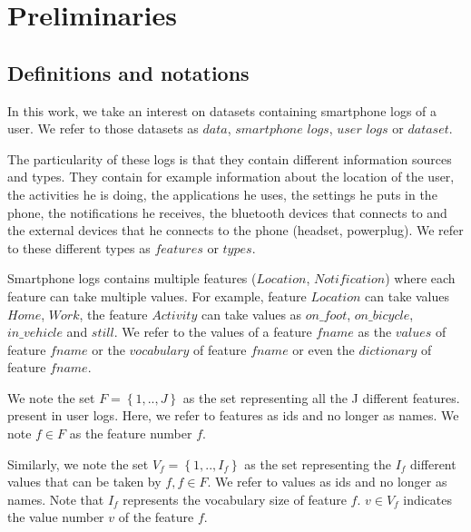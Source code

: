 
\chapter{Preliminaries} %

\label{Chapter2} %



\section{Definitions and notations}

In this work, we take an interest on datasets containing smartphone logs of a user. We refer to those datasets as $data$, $smartphone$ $logs$, $user$ $logs$ or $dataset$.

The particularity of these logs is that they contain different information sources and types. They contain for example information about the location of the user, the activities he is doing, the applications he uses, the settings he puts in the phone, the notifications he receives, the bluetooth devices that connects to and the external devices that he connects to the phone (headset, powerplug).
We refer to these different types as $features$ or $types$.

Smartphone logs contains multiple features ($Location$, $Notification$) where each feature can take multiple values. For example, feature $Location$ can take values $Home$, $Work$, the feature $Activity$ can take values as $on\_foot$, $on\_bicycle$, $in\_vehicle$ and $still$. We refer to the values of a feature $fname$ as the $values$ of feature $fname$ or the $vocabulary$ of feature $fname$ or even the $dictionary$ of feature $fname$.

We note the set $F= \left \{ 1,.., J \right \}$ as the set representing all the J different features. present in user logs. Here, we refer to features as ids and no longer as names. We note $f \in F$ as the feature number $f$.

Similarly, we note the set $V_f = \left \{ 1,.., I_f \right \} $ as the set representing the $I_f$ different values that can be taken by $f, f \in F$. We refer to values as ids and no longer as names. Note that $I_f$ represents the vocabulary size of feature $f$. $v \in V_f$ indicates the value number $v$ of the feature $f$.

